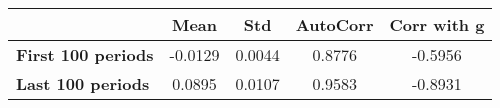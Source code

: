 \begin{tiny}\begin{tabular}{|l|c|c|c|c|}
\hline
&\textbf{Mean}&\textbf{Std}&\textbf{AutoCorr}&\textbf{Corr with g}\\\hline
\textbf{First 100 periods}&-0.0129&0.0044&0.8776&-0.5956\\\hline
\textbf{Last 100 periods}&0.0895&0.0107&0.9583&-0.8931\\\hline
\end{tabular}
\end{tiny}